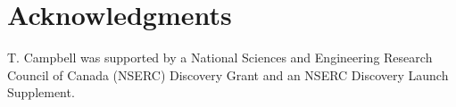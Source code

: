 \documentclass{article}
\begin{document}


\section*{Acknowledgments}
T. Campbell was supported by a National Sciences and Engineering Research Council of Canada (NSERC) Discovery Grant and an NSERC Discovery Launch Supplement.






\appendix





\end{document}
